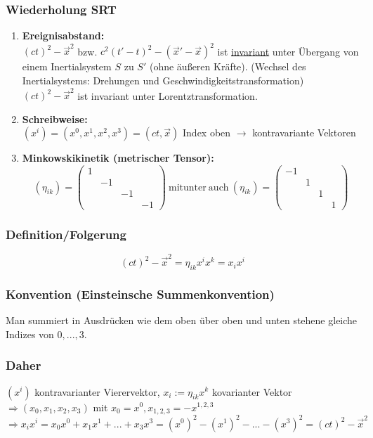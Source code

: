 \documentclass[twoside,a4paper]{scrartcl}
\renewcommand{\1}{\mathds{1}}
\newcommand{\Ra}{\Rightarrow}
\newcommand{\ra}{\rightarrow}
\begin{document}
\subsubsection{Wiederholung SRT}
\begin{enumerate}
\item \textbf{Ereignisabstand:}\\
$(ct)^2-\vec x^2$ bzw. $c^2(t'-t)^2-(\vec x'-\vec x)^2$ ist \underline{invariant} unter Übergang von einem Inertialsystem $S$ zu $S'$ (ohne äußeren Kräfte). (Wechsel des Inertialsystems: Drehungen und Geschwindigkeitstransformation)\\
$(ct)^2-\vec x^2$ ist invariant unter Lorentztransformation.
\item \textbf{Schreibweise:}\\
$(x^i)=(x^0,x^1,x^2,x^3)=(ct,\vec x)$ Index oben $\ra$ kontravariante Vektoren
\item \textbf{Minkowskikinetik (metrischer Tensor):}\\
$$(\eta_{ik})=\begin{pmatrix}1 \\ & -1 \\ & & -1 \\ & & & -1\end{pmatrix} \ \mathrm{mitunter \ auch \ } (\eta_{ik})=\begin{pmatrix}-1 \\ & 1 \\ & & 1 \\ & & & 1\end{pmatrix}$$
\end{enumerate}
\subsubsection*{Definition/Folgerung}
$$(ct)^2-\vec x^2= \eta_{ik} x^ix^k=x_ix^i$$
\subsubsection*{Konvention (Einsteinsche Summenkonvention)}
Man summiert in Ausdrücken wie dem oben über oben und unten stehene gleiche Indizes von $0,...,3$.
\subsubsection*{Daher}
$(x^i)$ kontravarianter Vierervektor, $x_i:= \eta_{ik}x^k$ kovarianter Vektor\\
$\Ra (x_0,x_1,x_2,x_3)$ mit $x_0=x^0, x_{1,2,3}=-x^{1,2,3}$\\
$\Ra x_ix^i=x_0x^0+x_1x^1+...+x_3x^3=(x^0)^2-(x^1)^2-...-(x^3)^2=(ct)^2-\vec x^2$
\end{document}

